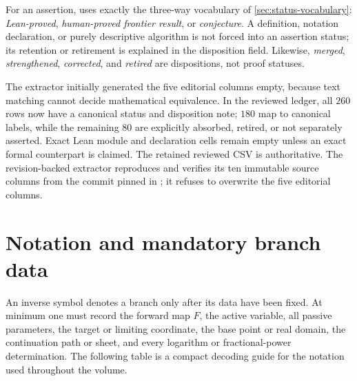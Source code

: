 For an assertion,  uses exactly the three-way
vocabulary of \cref{sec:status-vocabulary}:
\emph{Lean-proved}, \emph{human-proved frontier result}, or
\emph{conjecture}.  A definition, notation declaration, or purely descriptive
algorithm is not forced into an assertion status; its retention or retirement
is explained in the disposition field.  Likewise, \emph{merged},
\emph{strengthened}, \emph{corrected}, and \emph{retired} are dispositions,
not proof statuses.

The extractor initially generated the five editorial columns empty, because
text matching cannot decide mathematical equivalence.  In the reviewed
ledger, all \(260\) rows now have a canonical status and disposition note;
\(180\) map to canonical labels, while the remaining \(80\) are explicitly
absorbed, retired, or not separately asserted.  Exact Lean module and
declaration cells remain empty unless an exact formal counterpart is claimed.
The retained reviewed CSV is authoritative.  The revision-backed extractor
 reproduces and verifies its ten
immutable source columns from the commit pinned in
; it refuses to overwrite the five editorial
columns.

\section{Notation and mandatory branch data}
\label{sec:ref-notation}

An inverse symbol denotes a branch only after its data have been fixed.  At
minimum one must record the forward map \(F\), the active variable, all passive
parameters, the target or limiting coordinate, the base point or real domain,
the continuation path or sheet, and every logarithm or fractional-power
determination.  The following table is a compact decoding guide for the
notation used throughout the volume.

